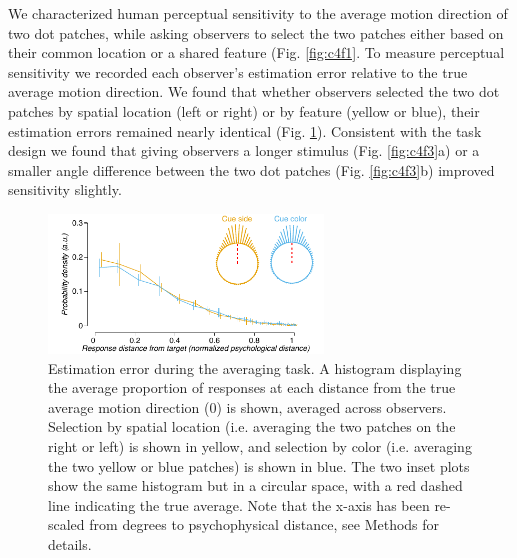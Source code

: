 We characterized human perceptual sensitivity to the average motion direction of two dot patches, while asking observers to select the two patches either based on their common location or a shared feature (Fig. \ref{fig:c4f1}. To measure perceptual sensitivity we recorded each observer's estimation error relative to the true average motion direction. We found that whether observers selected the two dot patches by spatial location (left or right) or by feature (yellow or blue), their estimation errors remained nearly identical (Fig. \ref{fig:c4f2}). Consistent with the task design we found that giving observers a longer stimulus (Fig. \ref{fig:c4f3}a) or a smaller angle difference between the two dot patches (Fig. \ref{fig:c4f3}b) improved sensitivity slightly. 

\begin{figure}
\centering
\includegraphics[keepaspectratio,width=0.65\textwidth]{figs_c4/f2_aca_perf.pdf}
\caption[Estimation error during averaging]{Estimation error during the averaging task. A histogram displaying the average proportion of responses at each distance from the true average motion direction (0) is shown, averaged across observers. Selection by spatial location (i.e. averaging the two patches on the right or left) is shown in yellow, and selection by color (i.e. averaging the two yellow or blue patches) is shown in blue. The two inset plots show the same histogram but in a circular space, with a red dashed line indicating the true average. Note that the x-axis has been re-scaled from degrees to psychophysical distance, see Methods for details.}
\label{fig:c4f2}
\end{figure}

